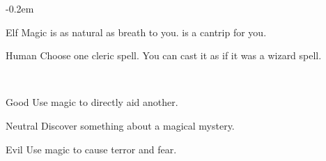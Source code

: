 \documentclass[8pt]{extarticle}
\begin{document}
\openup -0.2em

\charbanner

\begin{minipage}[t]{3.2in}

\begin{optfeature}{Elf}
  Magic is as natural as breath to you.  is a
  cantrip for you.
\end{optfeature}

\begin{optfeature}{Human}
  Choose one cleric spell. You can cast it as if it was a wizard
  spell.
\end{optfeature}

\ 


\begin{optfeature}{Good}
  Use magic to directly aid another.
\end{optfeature}

\begin{optfeature}{Neutral}
  Discover something about a magical mystery.
\end{optfeature}

\begin{optfeature}{Evil}
  Use magic to cause terror and fear.
\end{optfeature}

\ 



\vfill\null
\end{minipage}
\end{document}
